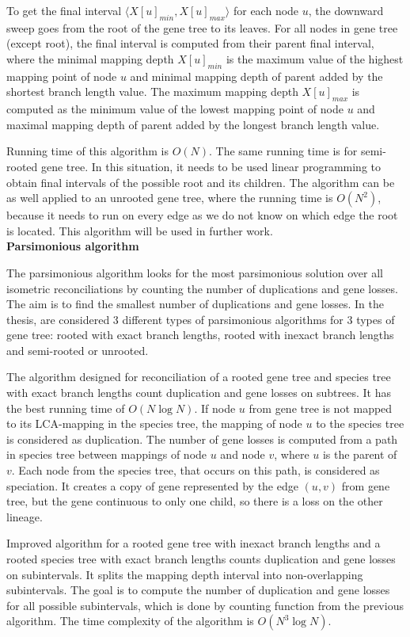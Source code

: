 To get the final interval $\langle X[u]_{min}, X[u]_{max} \rangle$ for each node $u$, the downward sweep goes from the root of the gene tree to its leaves.
For all nodes in gene tree (except root), the final interval is computed from their parent final interval, where the minimal mapping depth $X[u]_{min}$ is the maximum value of the highest mapping point of node $u$ and minimal mapping depth of parent added by the shortest branch length value. The maximum mapping depth $X[u]_{max}$ is computed as the minimum value of the lowest mapping point of node $u$ and maximal mapping depth of parent added by the longest branch length value.

Running time of this algorithm is $O(N)$. The same running time is for semi-rooted gene tree. In this situation, it needs to be used linear programming to obtain final intervals of the possible root and its children. The algorithm can be as well applied to an unrooted gene tree, where the running time is $O(N^2)$, because it needs to run on every edge as we do not know on which edge the root is located. This algorithm will be used in further work.\\
\textbf{Parsimonious algorithm}

The parsimonious algorithm looks for the most parsimonious solution over all isometric reconciliations by counting the number of duplications and gene losses. The aim is to find the smallest number of duplications and gene losses. In the thesis, \cite{chladek_thesis} are considered 3 different types of parsimonious algorithms for 3 types of gene tree: rooted with exact branch lengths, rooted with inexact branch lengths and semi-rooted or unrooted.

The algorithm designed for reconciliation of a rooted gene tree and species tree with exact branch lengths count duplication and gene losses on subtrees. It has the best running time of $O(N \log N)$. If node $u$ from gene tree is not mapped to its LCA-mapping in the species tree, the mapping of node $u$ to the species tree is considered as duplication. The number of gene losses is computed from a path in species tree between mappings of node $u$ and node $v$, where $u$ is the parent of $v$. Each node from the species tree, that occurs on this path, is considered as speciation. It creates a copy of gene represented by the edge $(u, v)$ from gene tree, but the gene continuous to only one child, so there is a loss on the other lineage.

Improved algorithm for a rooted gene tree with inexact branch lengths and a rooted species tree with exact branch lengths counts duplication and gene losses on subintervals. It splits the mapping depth interval into non-overlapping subintervals. The goal is to compute the number of duplication and gene losses for all possible subintervals, which is done by counting function from the previous algorithm. The time complexity of the algorithm is $O(N^3 \log N)$.


